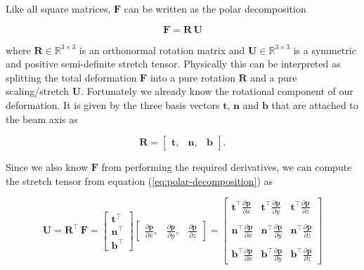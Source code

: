 
Like all square matrices, $\boldsymbol{F}$ can be written as the polar decomposition

\begin{equation}
\boldsymbol{F} = \boldsymbol{R}\,\boldsymbol{U} \label{eq:polar-decomposition}
\end{equation}

where $\boldsymbol{R} \in \mathbb{R}^{3 \times 3}$ is an orthonormal rotation matrix and $\boldsymbol{U} \in \mathbb{R}^{3 \times 3}$ is a symmetric and positive semi-definite stretch tensor.
Physically this can be interpreted as splitting the total deformation $\boldsymbol{F}$ into a pure rotation $\boldsymbol{R}$ and a pure scaling/stretch $\boldsymbol{U}$.
Fortunately we already know the rotational component of our deformation. It is given by the three basis vectors $\boldsymbol{t}$, $\boldsymbol{n}$ and $\boldsymbol{b}$ that are attached to the beam axis as

\begin{equation}
\boldsymbol{R} = \begin{bmatrix}
\boldsymbol{t}, & \boldsymbol{n}, & \boldsymbol{b}
\end{bmatrix}.
\end{equation}

Since we also know $\boldsymbol{F}$ from performing the required derivatives, we can compute the stretch tensor from equation (\ref{eq:polar-decomposition}) as

\begin{equation}
\boldsymbol{U} = \boldsymbol{R}^\intercal\,\boldsymbol{F} =
\begin{bmatrix}
\boldsymbol{t}^\intercal \\
\boldsymbol{n}^\intercal \\
\boldsymbol{b}^\intercal
\end{bmatrix}
\begin{bmatrix}
\frac{\partial\boldsymbol{p}}{\partial x}, & \frac{\partial\boldsymbol{p}}{\partial y}, & \frac{\partial\boldsymbol{p}}{\partial z}
\end{bmatrix}
=
\begin{bmatrix}
\boldsymbol{t}^\intercal\frac{\partial\boldsymbol{p}}{\partial x} & \boldsymbol{t}^\intercal\frac{\partial\boldsymbol{p}}{\partial y} & \boldsymbol{t}^\intercal\frac{\partial\boldsymbol{p}}{\partial z} \\
\\
\boldsymbol{n}^\intercal\frac{\partial\boldsymbol{p}}{\partial x} & \boldsymbol{n}^\intercal\frac{\partial\boldsymbol{p}}{\partial y} & \boldsymbol{n}^\intercal\frac{\partial\boldsymbol{p}}{\partial z} \\
\\
\boldsymbol{b}^\intercal\frac{\partial\boldsymbol{p}}{\partial x} & \boldsymbol{b}^\intercal\frac{\partial\boldsymbol{p}}{\partial y} & \boldsymbol{b}^\intercal\frac{\partial\boldsymbol{p}}{\partial z}
\end{bmatrix}
\end{equation}

